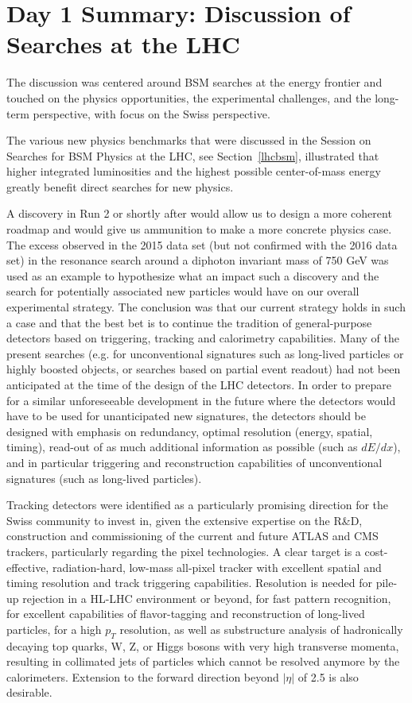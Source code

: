 \section{Day 1 Summary: Discussion of Searches at the LHC}\label{discussionsearches}

The discussion was centered around BSM searches at the energy frontier and touched on the physics opportunities, the experimental challenges, and the long-term perspective, with focus on the Swiss perspective.

The various new physics benchmarks that were discussed in the Session on Searches for BSM Physics at the LHC, see Section~\ref{lhcbsm}, illustrated that higher integrated luminosities and the highest possible center-of-mass energy greatly benefit direct searches for new physics.

A discovery in Run 2 or shortly after would allow us to design a more coherent roadmap and would give us ammunition to make a more concrete physics case.  The excess observed in the 2015 data set (but not confirmed with the 2016 data set) in the resonance search around a diphoton invariant mass of 750 GeV was used as an example to hypothesize what an impact such a discovery and the search for potentially associated new particles would have on our overall experimental strategy.  The conclusion was that our current strategy holds in such a case and that the best bet is to continue the tradition of general-purpose detectors based on triggering, tracking and calorimetry capabilities.  Many of the present searches (e.g. for unconventional signatures such as long-lived particles or highly boosted objects, or searches based on partial event readout) had not been anticipated at the time of the design of the LHC detectors.  In order to prepare for a similar unforeseeable development in the future where the detectors would have to be used for unanticipated new signatures, the detectors should be designed with emphasis on redundancy, optimal resolution (energy, spatial, timing), read-out of as much additional information as possible (such as $dE/dx$), and in particular triggering and reconstruction capabilities of unconventional signatures (such as long-lived particles).

Tracking detectors were identified as a particularly promising direction for the Swiss community to invest in, given the extensive expertise on the R\&D, construction and commissioning of the current and future ATLAS and CMS trackers, particularly regarding the pixel technologies.  A clear target is a cost-effective, radiation-hard, low-mass all-pixel tracker with excellent spatial and timing resolution and track triggering capabilities.  Resolution is needed for pile-up rejection in a HL-LHC environment or beyond, for fast pattern recognition, for excellent capabilities of flavor-tagging and reconstruction of long-lived particles, for a high $p_T$ resolution, as well as substructure analysis of hadronically decaying top quarks, W, Z, or Higgs bosons with very high transverse momenta, resulting in collimated jets of particles which cannot be resolved anymore by the calorimeters.  Extension to the forward direction beyond $|\eta |$ of 2.5 is also desirable.

